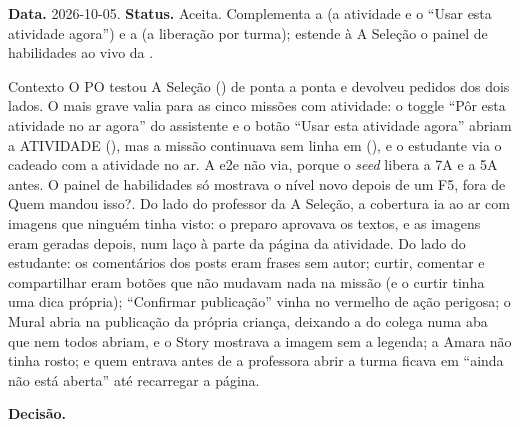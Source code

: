 \textbf{Data.} 2026-10-05. \textbf{Status.} Aceita. Complementa a
 (a atividade e o \enquote{Usar esta atividade agora}) e a
 (a liberação por turma); estende à A Seleção o painel de
habilidades ao vivo da .

\begin{especificacao}{Contexto}
O PO testou A Seleção () de ponta a ponta e devolveu pedidos dos
dois lados. O mais grave valia para as cinco missões com atividade: o toggle
\enquote{Pôr esta atividade no ar agora} do assistente e o botão \enquote{Usar
esta atividade agora} abriam a ATIVIDADE (), mas a missão
continuava sem linha em  (), e o estudante via o
cadeado com a atividade no ar. A e2e não via, porque o \emph{seed} libera a 7A
e a 5A antes. O painel de habilidades só mostrava o nível novo depois de um F5,
fora de Quem mandou isso?. Do lado do professor da A Seleção, a cobertura ia ao
ar com imagens que ninguém tinha visto: o preparo aprovava os textos, e as
imagens eram geradas depois, num laço à parte da página da atividade. Do lado
do estudante: os comentários dos posts eram frases sem autor; curtir,
comentar e compartilhar eram botões que não mudavam nada na missão (e o curtir
tinha uma dica própria); \enquote{Confirmar publicação} vinha no vermelho de
ação perigosa; o Mural abria na publicação da própria criança, deixando a do
colega numa aba que nem todos abriam, e o Story mostrava a imagem sem a
legenda; a Amara não tinha rosto; e quem entrava antes de a professora abrir a
turma ficava em \enquote{ainda não está aberta} até recarregar a página.
\end{especificacao}

\textbf{Decisão.}

